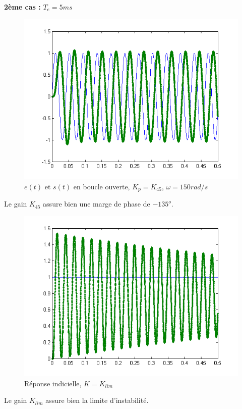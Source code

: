 \documentclass[../../Cours_M1.tex]{subfiles}
\begin{document}
\clearpage
\textbf{2ème cas :} $T_e = 5ms$

\begin{figure}[h!]
\centering
\includegraphics[scale=0.8]{m3retardpurTe5Kp45.png}
\caption{$e(t)$ et $s(t)$ en boucle ouverte, $K_p=K_{45}$, $\omega=150rad/s$}
\end{figure}

Le gain $K_{45}$ assure bien une marge de phase de $-135^o$.

\begin{figure}[h!]
\centering
\includegraphics[scale=0.8]{m3retardpurTe5.png}
\caption{Réponse indicielle, $K=K_{lim}$}
\end{figure}

Le gain $K_{lim}$ assure bien la limite d'instabilité.
\end{document}
